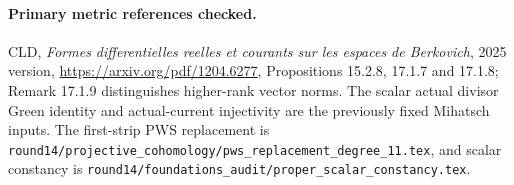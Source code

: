 \paragraph{Primary metric references checked.}
CLD, \emph{Formes differentielles reelles et courants sur les
espaces de Berkovich}, 2025 version,
\url{https://arxiv.org/pdf/1204.6277}, Propositions 15.2.8,
17.1.7 and 17.1.8; Remark 17.1.9 distinguishes higher-rank
vector norms. The scalar actual divisor Green identity and
actual-current injectivity are the previously fixed Mihatsch
inputs. The first-strip PWS replacement is
\texttt{round14/projective\_cohomology/pws\_replacement\_degree\_11.tex},
and scalar constancy is
\texttt{round14/foundations\_audit/proper\_scalar\_constancy.tex}.
